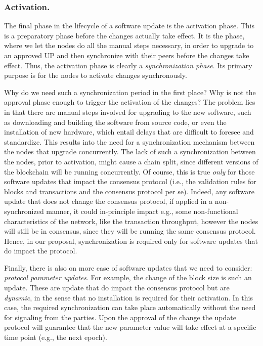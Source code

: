 \subsubsection{Activation.}\label{se:activation}

The final phase in the lifecycle of a software update is the activation phase. This is a preparatory phase before the changes actually take effect. It is the phase, where we let the nodes do all the manual steps necessary, in order to upgrade to an approved UP and then synchronize with their peers before the changes take effect.
 Thus, the activation phase is clearly a \emph{synchronization phase}. Its 
 primary purpose is for the nodes to activate changes synchronously.

Why do we need such a synchronization period in the first place? Why is not the 
approval phase enough to trigger the activation of the changes? The problem 
lies in that there are manual steps involved for upgrading to the new software, 
such as downloading and building the software from source code, or even the 
installation of new hardware, which entail delays that are difficult to foresee 
and standardize. This results into the need for a synchronization mechanism 
between the nodes that upgrade concurrently. The lack of such a synchronization 
between the nodes, prior to activation, might cause a chain split, since 
different versions of the blockchain will be running concurrently. Of course, 
this is true \emph{only} for those software updates that impact the consensus 
protocol (i.e., the validation rules for blocks and transactions and the 
consensus protocol per se). Indeed, any software update that does not change 
the consensus protocol, if applied in a non-synchronized manner, it could 
in-principle impact e.g., some non-functional characteristics of the network, 
like the transaction throughput, however the nodes will still be in consensus, 
since they will be running the same consensus protocol. Hence, in our proposal, 
synchronization is required only for software updates that do impact the 
protocol.

Finally, there is also on more case of software updates that we need to 
consider: \emph{protocol parameter updates}. For example, the change of the 
block size is such an update. These are update that do impact the consensus 
protocol but are \emph{dynamic}, in the sense that no installation is required 
for their activation. In this case, the required synchronization can take place 
automatically without the need for signaling from the parties. Upon the 
approval of the change the update protocol will guarantee that the new 
parameter value will take effect at a specific time point (e.g., the next 
epoch).


